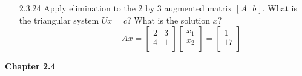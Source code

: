 \documentclass[10pt,twoside,reqno]{article}
\begin{document}
\begin{enumerate}
\vspace{3mm}
\item[2.3.24]Apply elimination to the 2 by 3 augmented matrix $[A\hspace{8pt}b\hspace{1pt}]$. What is the triangular system $U x = c$? What is the solution $x$? \\
\vspace{3mm}
$
$$
\hspace{145pt}
Ax=
\begin{bmatrix}
2&3\\
4&1\\
\end{bmatrix}
\begin{bmatrix}
x_{1}\\
x_{2}\\
\end{bmatrix}
=
\begin{bmatrix}
1\\
17\\
\end{bmatrix}
$$
$
\vspace{3mm}
\end{enumerate}
\vspace{5mm}
\textbf{Chapter 2.4}
\end{document}
